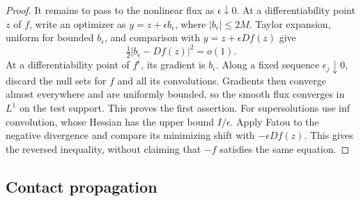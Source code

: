 \begin{proof}
It remains to pass to the nonlinear flux as $\epsilon\downarrow0$.
At a differentiability point $z$ of $f$, write an optimizer as
$y=z+\epsilon b_\epsilon$, where $|b_\epsilon|\leq2M$.
Taylor expansion, uniform for bounded $b_\epsilon$, and comparison
with $y=z+\epsilon Df(z)$ give
\[
 \tfrac12|b_\epsilon-Df(z)|^2=o(1).
\]
At a differentiability point of $f^\epsilon$, its gradient is
$b_\epsilon$. Along a fixed sequence $\epsilon_j\downarrow0$,
discard the null sets for $f$ and all its convolutions. Gradients then
converge almost everywhere and are uniformly bounded, so the smooth
flux converges in $L^1$ on the test support. This proves the first
assertion. For supersolutions use inf convolution, whose Hessian has
the upper bound $I/\epsilon$. Apply Fatou to the negative divergence
and compare its minimizing shift with $-\epsilon Df(z)$. This gives
the reversed inequality, without claiming that $-f$ satisfies the
same equation.
\end{proof}

\subsection{Contact propagation}

